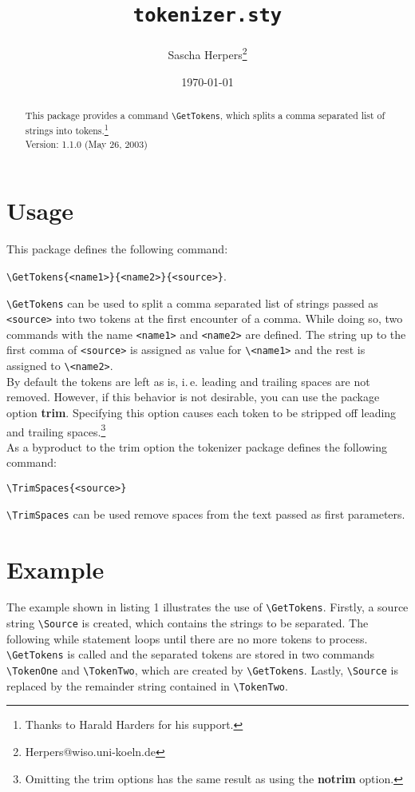 \documentclass[draft]{article}
\begin{document}
\title{\texttt{tokenizer.sty}}
\author{Sascha Herpers\thanks{Herpers@wiso.uni-koeln.de}}
\date{\today} \maketitle
\begin{abstract}
\noindent This package provides a command \verb+\GetTokens+, which
splits a comma separated list of strings into
tokens.\footnote{Thanks to Harald Harders for his support.}\\

\noindent Version: 1.1.0 (May 26, 2003)
\end{abstract}

\section{Usage}
This package defines the following command:
\begin{center}
\verb+\GetTokens{<name1>}{<name2>}{<source>}+.
\end{center}

\verb+\GetTokens+ can be used to split a comma separated list of
strings passed as \verb+<source>+ into two tokens at the first
encounter of a comma. While doing so, two commands with the name
\verb+<name1>+ and \verb+<name2>+ are defined. The string up to
the first comma of \verb+<source>+ is assigned as value for
\verb+\<name1>+ and the rest is assigned to \verb+\<name2>+.\\

By default the tokens are left as is, i.\,e. leading and trailing
spaces are not removed. However, if this behavior is not
desirable, you can use the package option \textbf{trim}.
Specifying this option causes each token to be stripped off
leading and trailing spaces.\footnote{Omitting the trim options
has the same result as using the \textbf{notrim} option.}\\

As a byproduct to the trim option the tokenizer package defines
the following command:
\begin{center}
\verb+\TrimSpaces{<source>}+
\end{center}
\verb+\TrimSpaces+ can be used remove spaces from the text passed
as first parameters.

\section{Example}
The example shown in listing 1 illustrates the use of
\verb+\GetTokens+. Firstly, a source string \verb+\Source+ is
created, which contains the strings to be separated. The following
while statement loops until there are no more tokens to process.
\verb+\GetTokens+ is called and the separated tokens are stored in
two commands \verb+\TokenOne+ and \verb+\TokenTwo+, which are
created by \verb+\GetTokens+. Lastly, \verb+\Source+ is replaced
by the remainder string contained in \verb+\TokenTwo+.\\
\end{document}
